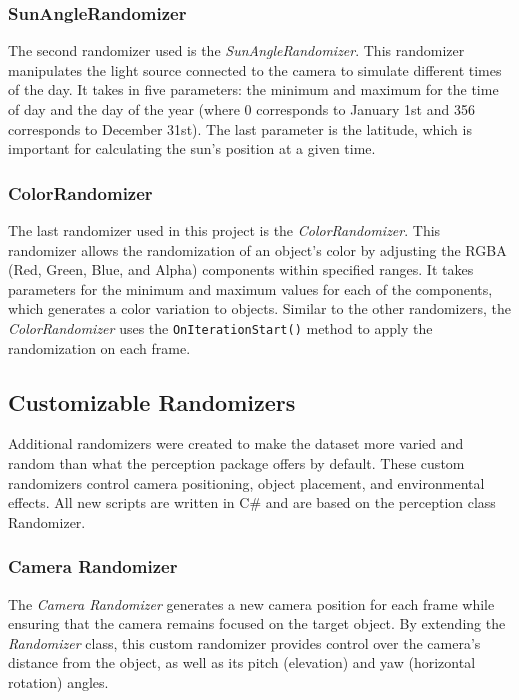 \subsubsection{SunAngleRandomizer}
The second randomizer used is the \textit{SunAngleRandomizer}. \cite{sun_angle_randomizer} This randomizer manipulates the light source connected to the camera to simulate different times of the day. It takes in five parameters: the minimum and maximum for the time of day and the day of the year (where 0 corresponds to January 1st and 356 corresponds to December 31st). The last parameter is the latitude, which is important for calculating the sun's position at a given time.

\subsubsection{ColorRandomizer}
The last randomizer used in this project is the \textit{ColorRandomizer}. \cite{color_randomizer} This randomizer allows the randomization of an object's color by adjusting the RGBA (Red, Green, Blue, and Alpha) components within specified ranges. It takes parameters for the minimum and maximum values for each of the components, which generates a color variation to objects. Similar to the other randomizers, the \textit{ColorRandomizer} uses the \texttt{OnIterationStart()} method to apply the randomization on each frame.


\subsection{Customizable Randomizers}
Additional randomizers were created to make the dataset more varied and random than what the perception package offers by default. These custom randomizers control camera positioning, object placement, and environmental effects. All new scripts are written in C\# and are based on the perception class Randomizer.

\subsubsection{Camera Randomizer}
The \textit{Camera Randomizer} generates a new camera position for each frame while ensuring that the camera remains focused on the target object. By extending the \textit{Randomizer} class, this custom randomizer provides control over the camera's distance from the object, as well as its pitch (elevation) and yaw (horizontal rotation) angles. 

